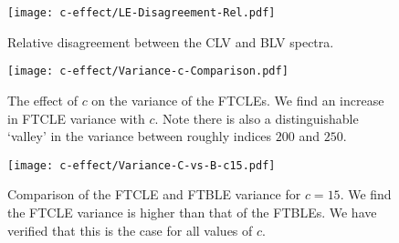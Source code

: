 \begin{figure}
	\centering
    \texttt{[image: c-effect/LE-Disagreement-Rel.pdf]}
    \caption{Relative disagreement between the CLV and BLV spectra.}
    \label{fig:c-Rel-Disagree}
\end{figure}

\begin{figure}
	\centering
    \texttt{[image: c-effect/Variance-c-Comparison.pdf]}
    \caption{The effect of $c$ on the variance of the FTCLEs. We find an increase in FTCLE variance with $c$. Note there is also a distinguishable `valley' in the variance between roughly indices $200$ and $250$.}
    \label{fig:c-Variance}
\end{figure}

\begin{figure}
	\centering
    \texttt{[image: c-effect/Variance-C-vs-B-c15.pdf]}
    \caption{Comparison of the FTCLE and FTBLE variance for $c = 15$. We find the FTCLE variance is higher than that of the FTBLEs. We have verified that this is the case for all values of $c$.}
    \label{fig:c-variance-c-vs-b}
\end{figure}
